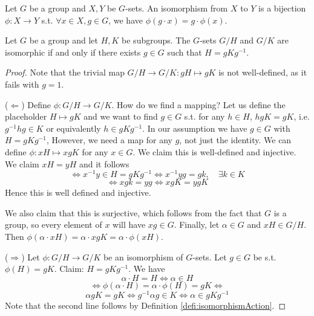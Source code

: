 \begin{definition} 
  Let $G$ be a group and $X,Y$ be $G$-sets. An isomorphism from $X$ to $Y$ is a bijection
  $\phi:X\to Y$ s.t. $\forall x\in X, g\in G$, we have $\phi(g\cdot x)=g\cdot \phi(x)$.
  \label{defi:isomorphismAction}
\end{definition}

\begin{theorem}
  Let $G$ be a group and let $H,K$ be subgroups. The $G$-sets $G/H$ and $G/K$ are
  isomorphic if and only if there exists $g\in G$ such that $H=gKg^{-1}$.
  \label{thm:cosetsIsomorphic}
\end{theorem}
\begin{proof} 
  Note that the trivial map $G/H\to G/K:gH\mapsto gK$ is not well-defined, as it fails
  with $g=1$.

  ($\Leftarrow$) Define $\phi:G/H\to G/K$. How do we find a mapping? Let us define the
  placeholder $H\mapsto gK$ and we want to find $g\in G$ s.t. for any $h\in H$,
  $hgK = gK$, i.e. $g^{-1}hg\in K$ or equivalently $h\in gKg^{-1}$. In our assumption we
  have $g\in G$ with $H=gKg^{-1}$, However, we need a map for any
  $g$, not just the identity. We can define $\phi:xH\mapsto xgK$ for any $x\in G$.
  We claim this is well-defined and injective. We claim $xH=yH$ and it follows
  \[\iff x^{-1}y\in H=gKg^{-1} \iff x^{-1}yg = gk, \quad \exists k\in K \]
  \[\iff xgk= yg \iff xgK = ygK\]
Hence this is well defined and injective.

  We also claim that this is surjective, which follows from the fact that $G$ is a group,
  so every element of $x$ will have $xg\in G$. Finally, let $\alpha\in G$ and $xH\in
  G/H$. Then $\phi(\alpha \cdot xH)=\alpha \cdot xgK = \alpha \cdot \phi(xH)$.

  ($\Rightarrow$) Let $\phi: G/H\to G/K$ be an isomorphism of $G$-sets. Let $g\in G$ be
  s.t. $\phi(H)=gK$. Claim: $H=gKg^{-1}$. We have 
  \[\alpha\cdot H=H \iff \alpha\in H \]
  \[\iff \phi(\alpha\cdot H)=\alpha\cdot \phi(H)=gK\iff \]
    \[\alpha g K = gK \iff g^{-1}\alpha g\in K \iff \alpha \in gKg^{-1}\]
    Note that the second line follows by Definition \ref{defi:isomorphismAction}.
\end{proof}
